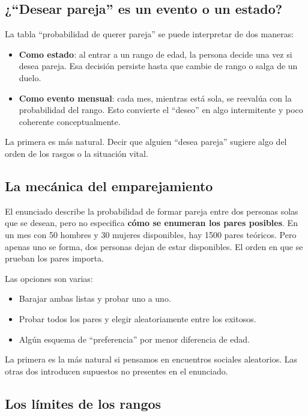 \documentclass[12pt,a4paper]{article}
\begin{document}
\subsection{¿``Desear pareja'' es un evento o un estado?}

La tabla ``probabilidad de querer pareja'' se puede interpretar de dos maneras:

\begin{itemize}
    \item \textbf{Como estado}: al entrar a un rango de edad, la persona decide una vez si desea pareja. Esa decisión persiste hasta que cambie de rango o salga de un duelo.
    \item \textbf{Como evento mensual}: cada mes, mientras está sola, se reevalúa con la probabilidad del rango. Esto convierte el ``deseo'' en algo intermitente y poco coherente conceptualmente.
\end{itemize}

La primera es más natural. Decir que alguien ``desea pareja'' sugiere algo del orden de los rasgos o la situación vital.

\subsection{La mecánica del emparejamiento}

El enunciado describe la probabilidad de formar pareja entre dos personas solas que se desean, pero no especifica \textbf{cómo se enumeran los pares posibles}. En un mes con 50 hombres y 30 mujeres disponibles, hay 1500 pares teóricos. Pero apenas uno se forma, dos personas dejan de estar disponibles. El orden en que se prueban los pares importa.

Las opciones son varias:

\begin{itemize}
    \item Barajar ambas listas y probar uno a uno.
    \item Probar todos los pares y elegir aleatoriamente entre los exitosos.
    \item Algún esquema de ``preferencia'' por menor diferencia de edad.
\end{itemize}

La primera es la más natural si pensamos en encuentros sociales aleatorios. Las otras dos introducen supuestos no presentes en el enunciado.

\subsection{Los límites de los rangos}
\end{document}
